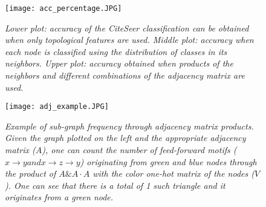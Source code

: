 \begin{figure}[ht!]
    \texttt{[image: acc\_percentage.JPG]}
    \centering
    \caption{\textit{
        Lower plot: accuracy of the CiteSeer classification can be obtained when only topological features are used. Middle plot: accuracy when each node is classified using the distribution of classes in its neighbors. Upper plot: accuracy obtained when products of the neighbors and different combinations of the adjacency matrix are used.
        }}
    \label{fig:acc_per}
\end{figure}


\begin{figure}[ht!]
    \texttt{[image: adj\_example.JPG]}
    \centering
    \caption{\textit{
        Example of sub-graph frequency through adjacency matrix products.   Given the graph plotted on the left and the appropriate adjacency matrix ($A$), one can count the number of feed-forward motifs ($x\rightarrow y and x\rightarrow z\rightarrow y$) originating from green and blue nodes through the product of $A \& A\cdot A$ with the color one-hot matrix of the nodes ($V$). One can see that there is a total of 1 such triangle and it originates from a green node.
        }}
    \label{fig:adj_example}
\end{figure}